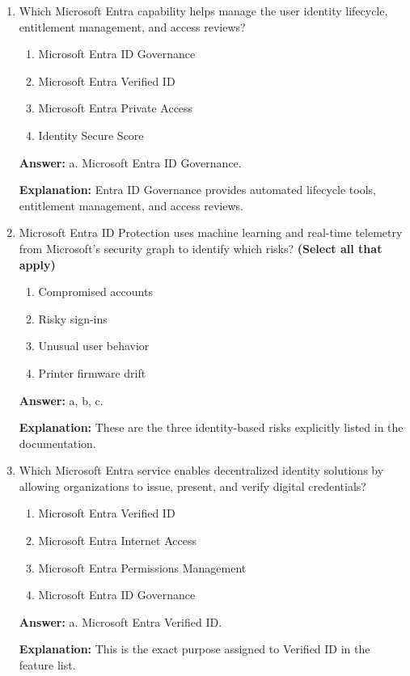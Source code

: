 \documentclass[10pt]{article}
\begin{document}
\begin{enumerate}[leftmargin=*]
\textbf{Explanation:} The feature list explicitly assigns just-in-time privileged access to PIM.

\item Which Microsoft Entra capability helps manage the user identity lifecycle, entitlement management, and access reviews?
\begin{enumerate}[label=\alph*., leftmargin=1.5em]
\item Microsoft Entra ID Governance
\item Microsoft Entra Verified ID
\item Microsoft Entra Private Access
\item Identity Secure Score
\end{enumerate}
\textbf{Answer:} a. Microsoft Entra ID Governance.

\textbf{Explanation:} Entra ID Governance provides automated lifecycle tools, entitlement management, and access reviews.

\item Microsoft Entra ID Protection uses machine learning and real-time telemetry from Microsoft’s security graph to identify which risks? \textbf{(Select all that apply)}
\begin{enumerate}[label=\alph*., leftmargin=1.5em]
\item Compromised accounts
\item Risky sign-ins
\item Unusual user behavior
\item Printer firmware drift
\end{enumerate}
\textbf{Answer:} a, b, c.

\textbf{Explanation:} These are the three identity-based risks explicitly listed in the documentation.

\item Which Microsoft Entra service enables decentralized identity solutions by allowing organizations to issue, present, and verify digital credentials?
\begin{enumerate}[label=\alph*., leftmargin=1.5em]
\item Microsoft Entra Verified ID
\item Microsoft Entra Internet Access
\item Microsoft Entra Permissions Management
\item Microsoft Entra ID Governance
\end{enumerate}
\textbf{Answer:} a. Microsoft Entra Verified ID.

\textbf{Explanation:} This is the exact purpose assigned to Verified ID in the feature list.


\end{enumerate}
\end{document}
